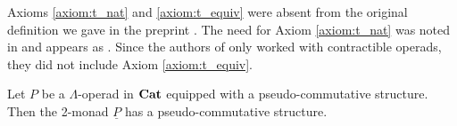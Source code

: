 \begin{rem}\label{rem:updated}
Axioms \eqref{axiom:t_nat} and \eqref{axiom:t_equiv} were absent from the original definition we gave in the preprint \cite{cg-preprint}. The need for Axiom \eqref{axiom:t_nat} was noted in \cite{guillou_symmetric} and appears as \cite[Axiom (iii) of 11.1]{guillou_multiplicative}. Since the authors of \cite{guillou_multiplicative} only worked with contractible operads, they did not include Axiom \eqref{axiom:t_equiv}.
\end{rem}

\begin{thm}\label{thm:pscomm}
Let $P$ be a $\Lambda$-operad in $\mathbf{Cat}$ equipped with a pseudo-commutative structure. Then the 2-monad $\underline{P}$ has a pseudo-commutative structure.
\end{thm}
